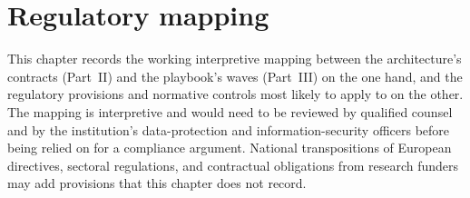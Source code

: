 
\chapter{Regulatory mapping}
\label{ch:regulatory-mapping}

\begin{caveatbox}
\noindent This chapter records the working interpretive mapping
between the architecture's contracts (Part~II) and the playbook's
waves (Part~III) on the one hand, and the regulatory provisions
and normative controls most likely to apply to 
on the other. The mapping is interpretive and would
need to be reviewed by qualified counsel and by the institution's
data-protection and information-security officers before being
relied on for a compliance argument. National transpositions of
European directives, sectoral regulations, and contractual
obligations from research funders may add provisions that this
chapter does not record.
\end{caveatbox}

